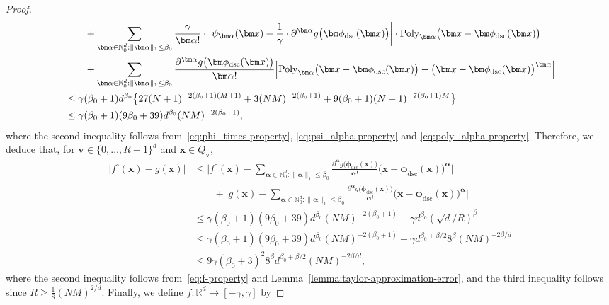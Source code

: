 \documentclass[12pt]{article}
\begin{document}
\begin{proof}
\begin{align}
        &\qquad + \sum_{\bm\alpha \in \mathbb{N}_0^d : \|\bm\alpha\|_1 \leq \beta_0} \frac{\gamma}{\bm\alpha!} \cdot \biggl| \psi_{\bm\alpha}(\bm x) - \frac{1}{\gamma}\cdot \partial^{\bm\alpha}g\bigl(\bm\phi_{\mathrm{dsc}}(\bm x)\bigr) \biggr| \cdot \mathrm{Poly}_{\bm\alpha}\bigl(\bm x - \bm\phi_{\mathrm{dsc}}(\bm x) \bigr) \nonumber\\
        &\qquad + \sum_{\bm\alpha \in \mathbb{N}_0^d : \|\bm\alpha\|_1 \leq \beta_0} \frac{\partial^{\bm\alpha}g\bigl(\bm\phi_{\mathrm{dsc}}(\bm x)\bigr)}{\bm\alpha!} \Bigl| \mathrm{Poly}_{\bm\alpha}\bigl(\bm x - \bm\phi_{\mathrm{dsc}}(\bm x) \bigr) - \bigl(\bm x - \bm\phi_{\mathrm{dsc}}(\bm x) \bigr)^{\bm\alpha} \Bigr| \nonumber\\
        &\leq \gamma(\beta_0+1)d^{\beta_0}\bigl\{ 27 (N+1)^{-2(\beta_0+1)(M+1)} + 3(NM)^{-2(\beta_0+1)} + 9(\beta_0+1)(N+1)^{-7(\beta_0+1)M} \bigr\} \nonumber\\
        &\leq \gamma(\beta_0+1)(9\beta_0+39)d^{\beta_0}(NM)^{-2(\beta_0+1)}, \label{eq:f-property}
    \end{align}
    where the second inequality follows from~\eqref{eq:phi_times-property}, \eqref{eq:psi_alpha-property} and \eqref{eq:poly_alpha-property}. Therefore, we deduce that, for $\bm v \in \{0,\ldots,R-1\}^d$ and $\bm x \in Q_{\bm v}$,
    \begin{align*}
        |f^\circ(\bm x) - g(\bm x)| &\leq \biggl|f^\circ(\bm x) - \sum_{\bm\alpha \in \mathbb{N}_0^d : \|\bm\alpha\|_1 \leq \beta_0} \frac{\partial^{\bm\alpha}g\bigl(\bm\phi_{\mathrm{dsc}}(\bm x)\bigr)}{\bm\alpha!} \bigl(\bm x - \bm\phi_{\mathrm{dsc}}(\bm x)\bigr)^{\bm\alpha} \biggr| \nonumber\\
        &\qquad + \biggl|g(\bm x) - \sum_{\bm\alpha \in \mathbb{N}_0^d : \|\bm\alpha\|_1 \leq \beta_0} \frac{\partial^{\bm\alpha}g\bigl(\bm\phi_{\mathrm{dsc}}(\bm x)\bigr)}{\bm\alpha!} \bigl(\bm x - \bm\phi_{\mathrm{dsc}}(\bm x)\bigr)^{\bm\alpha} \biggr| \nonumber\\
        &\leq \gamma(\beta_0+1)(9\beta_0+39)d^{\beta_0}(NM)^{-2(\beta_0+1)} + \gamma d^{\beta_0}(\sqrt{d}/R)^{\beta} \nonumber\\
        &\leq \gamma(\beta_0+1)(9\beta_0+39)d^{\beta_0}(NM)^{-2(\beta_0+1)} + \gamma d^{\beta_0+\beta/2} 8^{\beta}(NM)^{-2\beta/d} \nonumber\\
        &\leq 9\gamma (\beta_0+3)^2 8^{\beta} d^{\beta_0+\beta/2} (NM)^{-2\beta/d}, 
    \end{align*}
    where the second inequality follows from~\eqref{eq:f-property} and Lemma~\ref{lemma:taylor-approximation-error}, and the third inequality follows since $R \geq \frac{1}{8}(NM)^{2/d}$. Finally, we define $f:\mathbb{R}^d \rightarrow [-\gamma,\gamma]$ by

\end{proof}
\end{document}
